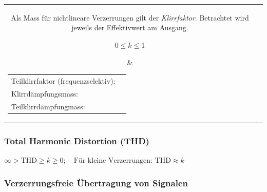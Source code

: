 			\begin{tabularx}{\textwidth}{cX}
				\parbox{9cm}{
					Als Mass für nichtlineare Verzerrungen gilt der \textit{Klirrfaktor}. Betrachtet wird jeweils der Effektivwert am Ausgang.
					\begin{center}
						 $ 0 \leq k \leq 1$ 
					\end{center}
				}
			&	\parbox{9cm}{
					\begin{tabular}{ll}
						Teilklirrfaktor (frequenzselektiv):
					&	\fbox{$k_m =  \frac {U_m} {\sqrt{ U_1^2+ U_2^2 + \ldots + U_n^2} }$}
					\\
						Klirrdämpfungsmass:
					& 	\fbox{$a_k = 20 \log \left( \frac1k \right)$}
					\\
						Teilklirrdämpfungmass:
					& 	\fbox{$a_k = 20 \log \left( \frac{1}{k_m} \right)$}
					\end{tabular}
				}
			\end{tabularx}

		
		\subsubsection{Total Harmonic Distortion (THD) }
		
			\begin{center}
				$\infty > \text{THD} \geq k \geq 0; \quad \text{Für kleine Verzerrungen: THD} \approx k $
			\end{center}

		
		\subsubsection{Verzerrungsfreie Übertragung von Signalen }
		
